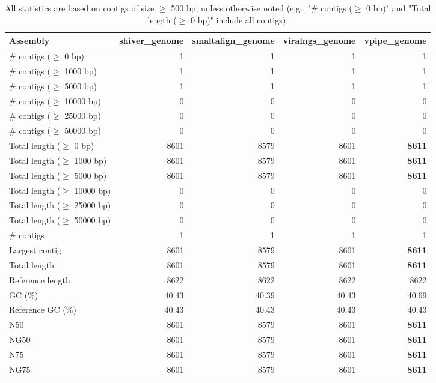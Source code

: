 \documentclass[12pt,a4paper]{article}
\begin{document}
\begin{table}[ht]
\begin{center}
\caption{All statistics are based on contigs of size $\geq$ 500 bp, unless otherwise noted (e.g., "\# contigs ($\geq$ 0 bp)" and "Total length ($\geq$ 0 bp)" include all contigs).}
\begin{tabular}{|l*{4}{|r}|}
\hline
Assembly & shiver\_genome & smaltalign\_genome & viralngs\_genome & vpipe\_genome \\ \hline
\# contigs ($\geq$ 0 bp) & 1 & 1 & 1 & 1 \\ \hline
\# contigs ($\geq$ 1000 bp) & 1 & 1 & 1 & 1 \\ \hline
\# contigs ($\geq$ 5000 bp) & 1 & 1 & 1 & 1 \\ \hline
\# contigs ($\geq$ 10000 bp) & 0 & 0 & 0 & 0 \\ \hline
\# contigs ($\geq$ 25000 bp) & 0 & 0 & 0 & 0 \\ \hline
\# contigs ($\geq$ 50000 bp) & 0 & 0 & 0 & 0 \\ \hline
Total length ($\geq$ 0 bp) & 8601 & 8579 & 8601 & {\bf 8611} \\ \hline
Total length ($\geq$ 1000 bp) & 8601 & 8579 & 8601 & {\bf 8611} \\ \hline
Total length ($\geq$ 5000 bp) & 8601 & 8579 & 8601 & {\bf 8611} \\ \hline
Total length ($\geq$ 10000 bp) & 0 & 0 & 0 & 0 \\ \hline
Total length ($\geq$ 25000 bp) & 0 & 0 & 0 & 0 \\ \hline
Total length ($\geq$ 50000 bp) & 0 & 0 & 0 & 0 \\ \hline
\# contigs & 1 & 1 & 1 & 1 \\ \hline
Largest contig & 8601 & 8579 & 8601 & {\bf 8611} \\ \hline
Total length & 8601 & 8579 & 8601 & {\bf 8611} \\ \hline
Reference length & 8622 & 8622 & 8622 & 8622 \\ \hline
GC (\%) & 40.43 & 40.39 & 40.43 & 40.69 \\ \hline
Reference GC (\%) & 40.43 & 40.43 & 40.43 & 40.43 \\ \hline
N50 & 8601 & 8579 & 8601 & {\bf 8611} \\ \hline
NG50 & 8601 & 8579 & 8601 & {\bf 8611} \\ \hline
N75 & 8601 & 8579 & 8601 & {\bf 8611} \\ \hline
NG75 & 8601 & 8579 & 8601 & {\bf 8611} \\ \hline

\end{tabular}
\end{center}
\end{table}
\end{document}
